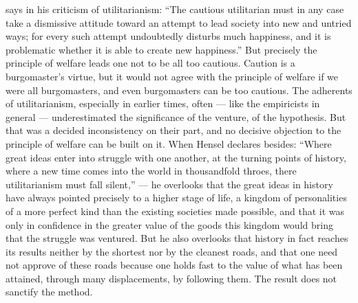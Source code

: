 \documentclass[12pt,a4paper,openany]{book}
\newcommand{\opage}[1]{\marginnote{\footnotesize\textit{[#1]}}}
\begin{document}
says in his criticism of utilitarianism: ``The cautious utilitarian must in any case take a dismissive
attitude toward an attempt to lead society into new and untried ways; for every such attempt undoubtedly
disturbs much happiness, and it is problematic whether it is able to create new happiness.'' But precisely
the principle of welfare leads one not to be all too cautious. Caution is a burgomaster's virtue, but it
would not agree with the principle of welfare if we were all burgomasters, and even burgomasters can be too
cautious. The adherents of utilitarianism, especially in earlier times, often --- like the empiricists in
general --- underestimated the significance of the venture, of the hypothesis. But that was a decided
inconsistency on their part, and no decisive objection to the principle of welfare can be built on it. When
Hensel declares besides: ``Where great ideas enter into struggle with one another, at the turning points of
history, where a new time comes into the world in thousandfold throes, there utilitarianism must fall
silent,'' --- he overlooks that the great ideas in history have always pointed precisely to a higher stage of
life, a kingdom of personalities of a more perfect kind than the existing societies made possible, and that
it was only in confidence in the greater value of the goods this kingdom would bring that the struggle was
ventured. But he also overlooks that history in fact reaches its
\opage{151}results neither by the shortest nor by the cleanest roads, and that one need not approve of these roads
because one holds fast to the value of what has been attained, through many displacements, by following
them. The result does not sanctify the method.
\end{document}
